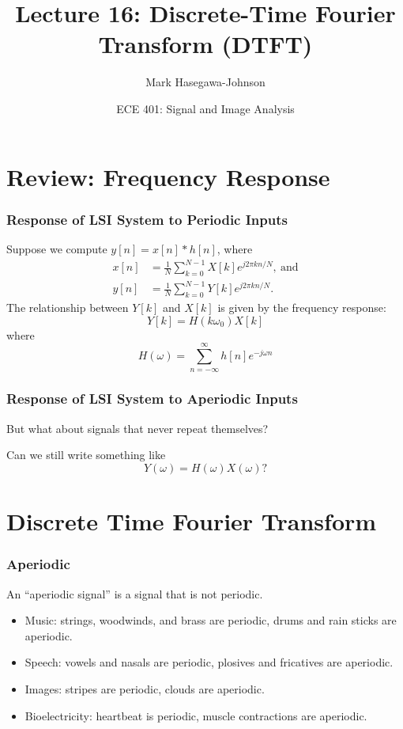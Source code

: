 \documentclass{beamer}
\title{Lecture 16: Discrete-Time Fourier Transform (DTFT)}
\author{Mark Hasegawa-Johnson}
\date{ECE 401: Signal and Image Analysis}
\begin{document}
\begin{frame}
  \maketitle
\end{frame}

\begin{frame}
  \tableofcontents
\end{frame}

\section[Review]{Review: Frequency Response}
\setcounter{subsection}{1}

\begin{frame}
  \frametitle{Response of LSI System to Periodic Inputs}
  Suppose we compute $y[n]=x[n]\ast h[n]$, where
  \begin{align*}
  x[n] &= \frac{1}{N}\sum_{k=0}^{N-1} X[k] e^{j2\pi kn/N},~\mbox{and}\\
  y[n] &= \frac{1}{N}\sum_{k=0}^{N-1} Y[k] e^{j2\pi kn/N}.
  \end{align*}
  The relationship between $Y[k]$ and $X[k]$ is given by the frequency
  response:
  \[
  Y[k] = H(k\omega_0) X[k]
  \]
  where
  \[
  H(\omega) = \sum_{n=-\infty}^\infty h[n]e^{-j\omega n}
  \]
\end{frame}

\begin{frame}
  \frametitle{Response of LSI System to Aperiodic Inputs}

  But what about signals that never repeat themselves?

  Can we still write something like
  \[
  Y(\omega)=H(\omega)X(\omega)?
  \]

\end{frame}
  
\section[DTFT]{Discrete Time Fourier Transform}
\setcounter{subsection}{1}

\begin{frame}
  \frametitle{Aperiodic}
  
  An ``aperiodic signal'' is a signal that is not periodic.
  \begin{itemize}
  \item Music: strings, woodwinds, and brass are periodic, drums and rain sticks are aperiodic.
  \item Speech: vowels and nasals are periodic, plosives and fricatives are aperiodic.
  \item Images: stripes are periodic, clouds are aperiodic.
  \item Bioelectricity: heartbeat is periodic, muscle contractions are aperiodic.
  \end{itemize}
\end{frame}
\end{document}
